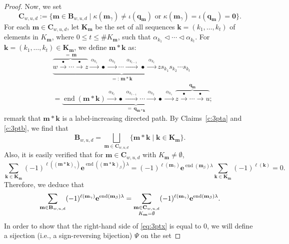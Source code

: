 \documentclass[11pt,a4paper,reqno,dvipdfmx]{amsart}
\numberwithin{equation}{section}
\newcommand{\be}{\mathbf{e}}
\newcommand{\bk}{\mathbf{k}}
\newcommand{\bm}{\mathbf{m}}
\newcommand{\bq}{\mathbf{q}}
\newcommand{\bB}{\mathbf{B}}
\newcommand{\bC}{\mathbf{C}}
\newcommand{\bK}{\mathbf{K}}
\newcommand{\bzero}{\mathbf{0}}
\DeclareMathOperator{\ed}{end}
\newcommand{\edge}[1]{ \xrightarrow{\hspace{2pt}#1\hspace{2pt}} }
\theoremstyle{plain}
\theoremstyle{definition}
\theoremstyle{remark}
\begin{document}
\begin{proof}
Now, we set
%
\begin{equation}
\bC_{w,u,d}:=\bigl\{
 \bm \in \bB_{w,u,d} \mid 
 \kappa(\bm_{\gamma}) \ne \iota(\bq_{\bm}) \text{ or } 
 \kappa(\bm_{\gamma}) = \iota(\bq_{\bm}) = \bzero \bigr\}.
\end{equation}
%
For each $\bm \in \bC_{w,u,d}$, let $\bK_{\bm}$ be the set of 
all sequences $\bk = (k_{1},\dots,k_{t})$ of elements in $K_{\bm}$, 
where $0 \le t \le \# K_{\bm}$, 
such that $\alpha_{k_{1}} \lhd \cdots \lhd \alpha_{k_{t}}$. 
For $\bk = (k_{1},\dots,k_{t}) \in \bK_{\bm}$, we define $\bm \ast \bk$ as: 
%
\begin{align*}
& \underbrace{\overbrace{ w \edge{\bullet} \cdots \edge{\bullet} z }^{= \, \bm} 
\edge{\alpha_{k_1}} \bullet \edge{\alpha_{k_2}} \cdots 
\edge{\alpha_{k_{t-1}}} \bullet \edge{\alpha_{k_t}} zs_{k_1}s_{k_2} \cdots s_{k_t} }_{=: \, \bm \ast \bk} \\
%
& = \underbrace{\ed(\bm \ast \bk) \edge{\alpha_{k_t}} \bullet \edge{\alpha_{k_{t-1}}} \cdots 
\edge{\alpha_{k_2}} \bullet \edge{\alpha_{k_1}} 
\overbrace{z \edge{\bullet} \cdots \edge{\bullet} u}^{\bq_{\bm}}}_{= \, \bq_{\bm \ast \bk}}; 
\end{align*}
%
remark that $\bm \ast \bk$ is a label-increasing directed path. 
By Claims~\ref{c:3pta} and \ref{c:3ptb}, we find that
%
\begin{equation}
\bB_{w,u,d} = \bigsqcup_{ \bm \in \bC_{w,u,d} }
\bigl\{ \bm \ast \bk \mid \bk \in \bK_{\bm} \bigr\}. 
\end{equation}
%
Also, it is easily verified that for $\bm \in \bC_{w,u,d}$ 
with $K_{\bm} \ne \emptyset$, 
%
\begin{equation}
\sum_{ \bk \in \bK_{\bm} }(-1)^{\ell( (\bm \ast \bk)_{\gamma})} \be^{\ed( (\bm \ast \bk)_{\beta} )\lambda} =
(-1)^{\ell(\bm_{\gamma})} \be^{ \ed(\bm_{\beta})\lambda } 
\sum_{ \bk \in \bK_{\bm} }(-1)^{\ell(\bk)} = 0.
\end{equation}
%
Therefore, we deduce that 
%
\begin{equation} \label{eq:3ptx}
\sum_{ \bm \in \bB_{w,u,d} }(-1)^{\ell(\bm_{\gamma})} \be^{\ed(\bm_{\beta})\lambda} = 
\sum_{ \begin{subarray}{c} \bm \in \bC_{w,u,d} \\ K_{\bm}=\emptyset \end{subarray} }
(-1)^{\ell(\bm_{\gamma})} \be^{\ed(\bm_{\beta})\lambda}.
\end{equation}
%
In order to show that the right-hand side of \eqref{eq:3ptx} is equal to $0$, 
we will define a sijection (i.e., a sign-reversing bijection) $\Psi$ on the set

\end{proof}
\end{document}
